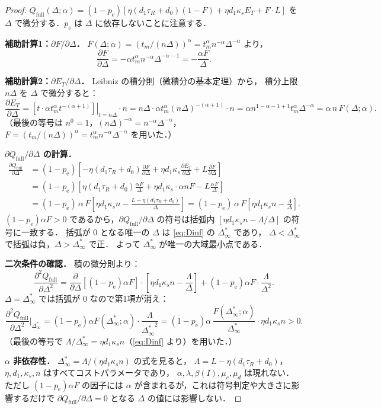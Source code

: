 \documentclass[12pt,a4paper]{article}
\theoremstyle{plain}
\theoremstyle{definition}
\theoremstyle{remark}
\newcommand{\pe}{p_{\mathrm{e}}}
\newcommand{\Qf}{Q_{\mathrm{full}}}
\newcommand{\betaI}{\beta(I)}
\newcommand{\Dinf}{\Delta^{*}_{\infty}}
\newcommand{\La}{\Lambda}
\begin{document}
\begin{proof}
$\Qf(\Delta;\alpha)=(1-\pe)[\eta(d_1\tau_R+d_0)(1-F)+\eta d_1\kappa_s E_T+F\cdot L]$
を $\Delta$ で微分する．$\pe$ は $\Delta$ に依存しないことに注意する．

\medskip
\noindent\textbf{補助計算1：$\partial F/\partial\Delta$．}
$F(\Delta;\alpha)=(t_m/(n\Delta))^\alpha=t_m^\alpha n^{-\alpha}\Delta^{-\alpha}$ より，
\[
\frac{\partial F}{\partial\Delta}
=-\alpha t_m^\alpha n^{-\alpha}\Delta^{-\alpha-1}
=-\frac{\alpha F}{\Delta}.
\]

\medskip
\noindent\textbf{補助計算2：$\partial E_T/\partial\Delta$．}
Leibniz の積分則（微積分の基本定理）から，
積分上限 $n\Delta$ を $\Delta$ で微分すると：
\[
\frac{\partial E_T}{\partial\Delta}
=\left.\left[t\cdot\alpha t_m^\alpha t^{-(\alpha+1)}\right]\right|_{t=n\Delta}\cdot n
=n\Delta\cdot\alpha t_m^\alpha(n\Delta)^{-(\alpha+1)}\cdot n
=\alpha n^{1-\alpha-1+1}t_m^\alpha\Delta^{-\alpha}
=\alpha\,n\,F(\Delta;\alpha).
\]
（最後の等号は $n^0=1$，$(n\Delta)^{-\alpha}=n^{-\alpha}\Delta^{-\alpha}$，
$F=(t_m/(n\Delta))^\alpha=t_m^\alpha n^{-\alpha}\Delta^{-\alpha}$ を用いた．）

\medskip
\noindent\textbf{$\partial\Qf/\partial\Delta$ の計算．}
\begin{align*}
\frac{\partial\Qf}{\partial\Delta}
&=(1-\pe)\!\left[
-\eta(d_1\tau_R+d_0)\frac{\partial F}{\partial\Delta}
+\eta d_1\kappa_s\frac{\partial E_T}{\partial\Delta}
+L\frac{\partial F}{\partial\Delta}
\right]\\
&=(1-\pe)\!\left[
\eta(d_1\tau_R+d_0)\frac{\alpha F}{\Delta}
+\eta d_1\kappa_s\cdot\alpha n F
-L\frac{\alpha F}{\Delta}
\right]\\
&=(1-\pe)\,\alpha\,F\!\left[
\eta d_1\kappa_s n
-\frac{L-\eta(d_1\tau_R+d_0)}{\Delta}
\right]
=(1-\pe)\,\alpha\,F\!\left[\eta d_1\kappa_s n-\frac{\La}{\Delta}\right].
\end{align*}
$(1-\pe)\alpha F>0$ であるから，$\partial\Qf/\partial\Delta$ の符号は括弧内
$[\eta d_1\kappa_s n-\La/\Delta]$ の符号に一致する．
括弧が 0 となる唯一の $\Delta$ は \eqref{eq:Dinf} の $\Dinf$ であり，
$\Delta<\Dinf$ で括弧は負，$\Delta>\Dinf$ で正．
よって $\Dinf$ が唯一の大域最小点である．

\medskip
\noindent\textbf{二次条件の確認．}
積の微分則より：
\[
\frac{\partial^2\Qf}{\partial\Delta^2}
=\frac{\partial}{\partial\Delta}\!\left[(1-\pe)\alpha F\right]\cdot\left[\eta d_1\kappa_s n-\frac{\La}{\Delta}\right]
+(1-\pe)\alpha F\cdot\frac{\La}{\Delta^2}.
\]
$\Delta=\Dinf$ では括弧が $0$ なので第1項が消え：
\[
\frac{\partial^2\Qf}{\partial\Delta^2}\bigg|_{\Dinf}
=(1-\pe)\alpha F(\Dinf;\alpha)\cdot\frac{\La}{{\Dinf}^2}
=(1-\pe)\alpha\,\frac{F(\Dinf;\alpha)}{\Dinf}\cdot\eta d_1\kappa_s n>0.
\]
（最後の等号で $\La/\Dinf=\eta d_1\kappa_s n$（\eqref{eq:Dinf} より）を用いた．）

\medskip
\noindent\textbf{$\alpha$ 非依存性．}
$\Dinf=\La/(\eta d_1\kappa_s n)$ の式を見ると，
$\La=L-\eta(d_1\tau_R+d_0)$，$\eta,d_1,\kappa_s,n$ はすべてコストパラメータであり，
$\alpha,\lambda,\betaI,\mu_c,\mu_d$ は現れない．
ただし $(1-\pe)\alpha F$ の因子には $\alpha$ が含まれるが，これは符号判定や大きさに影響するだけで
$\partial\Qf/\partial\Delta=0$ となる $\Delta$ の値には影響しない．
\end{proof}
\end{document}
